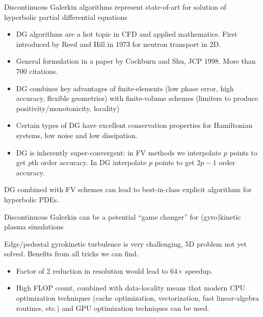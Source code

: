 \documentclass[pdf]{beamer}
\newcommand{\mypause}{\pause}
\theoremstyle{definition}
\begin{document}
\begin{frame}{Discontinuous Galerkin algorithms represent state-of-art
    for solution of hyperbolic partial differential equations}
  \begin{itemize}
    \small
  \item DG algorithms are a hot topic in CFD and applied
    mathematics. First introduced by Reed and Hill in 1973 for neutron
    transport in 2D.
    \mypause
  \item General formulation in a paper by Cockburn and Shu, JCP
    1998. More than 700 citations.  \mypause
  \item DG combines key advantages of finite-elements (low phase
    error, high accuracy, flexible geometries) with finite-volume
    schemes (limiters to produce positivity/monotonicity, locality)
    \mypause
  \item Certain types of DG have excellent conservation properties for
    Hamiltonian systems, low noise and low dissipation.
    \mypause
  \item DG is inherently super-convergent: in FV methods we
    interpolate $p$ points to get $p$th order accuracy. In DG
    interpolate $p$ points to get $2p-1$ order accuracy.
  \end{itemize}
  DG combined with FV schemes can lead to best-in-class explicit
  algorithms for hyperbolic PDEs.

\end{frame}

\begin{frame}{Discontinuous Galerkin can be a potential ``game
    changer'' for (gyro)kinetic plasma simulations}
  
  Edge/pedestal gyrokinetic turbulence is very challenging, 5D problem
  not yet solved. Benefits from all tricks we can find.
  \begin{itemize}
  \item Factor of 2 reduction in resolution would lead to 64$\times$
    speedup.
  \item High FLOP count, combined with data-locality means that modern
    CPU optimization techniques (cache optimization, vectorization,
    fast linear-algebra routines, etc.) and GPU optimization
    techniques can be used.
  \end{itemize}

\end{frame}
\end{document}
